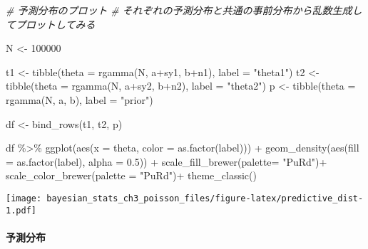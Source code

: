 \documentclass[
]{article}
\newenvironment{Shaded}{\begin{snugshade}}{\end{snugshade}}
\newcommand{\AttributeTok}[1]{\textcolor[rgb]{0.77,0.63,0.00}{#1}}
\newcommand{\CommentTok}[1]{\textcolor[rgb]{0.56,0.35,0.01}{\textit{#1}}}
\newcommand{\DecValTok}[1]{\textcolor[rgb]{0.00,0.00,0.81}{#1}}
\newcommand{\FloatTok}[1]{\textcolor[rgb]{0.00,0.00,0.81}{#1}}
\newcommand{\FunctionTok}[1]{\textcolor[rgb]{0.00,0.00,0.00}{#1}}
\newcommand{\NormalTok}[1]{#1}
\newcommand{\OtherTok}[1]{\textcolor[rgb]{0.56,0.35,0.01}{#1}}
\newcommand{\SpecialCharTok}[1]{\textcolor[rgb]{0.00,0.00,0.00}{#1}}
\newcommand{\StringTok}[1]{\textcolor[rgb]{0.31,0.60,0.02}{#1}}
\begin{document}
\begin{Shaded}
\begin{Highlighting}[]
\CommentTok{\# 予測分布のプロット}
\CommentTok{\# それぞれの予測分布と共通の事前分布から乱数生成してプロットしてみる}

\NormalTok{N }\OtherTok{\textless{}{-}} \DecValTok{100000}

\NormalTok{t1 }\OtherTok{\textless{}{-}} \FunctionTok{tibble}\NormalTok{(}\AttributeTok{theta =} \FunctionTok{rgamma}\NormalTok{(N, a}\SpecialCharTok{+}\NormalTok{sy1, b}\SpecialCharTok{+}\NormalTok{n1),}
             \AttributeTok{label =} \StringTok{"theta1"}\NormalTok{)}
\NormalTok{t2 }\OtherTok{\textless{}{-}} \FunctionTok{tibble}\NormalTok{(}\AttributeTok{theta =} \FunctionTok{rgamma}\NormalTok{(N, a}\SpecialCharTok{+}\NormalTok{sy2, b}\SpecialCharTok{+}\NormalTok{n2),}
             \AttributeTok{label =} \StringTok{"theta2"}\NormalTok{)}
\NormalTok{p }\OtherTok{\textless{}{-}} \FunctionTok{tibble}\NormalTok{(}\AttributeTok{theta =} \FunctionTok{rgamma}\NormalTok{(N, a, b),}
            \AttributeTok{label =} \StringTok{"prior"}\NormalTok{)}

\NormalTok{df }\OtherTok{\textless{}{-}} \FunctionTok{bind\_rows}\NormalTok{(t1, t2, p)}


\NormalTok{df }\SpecialCharTok{\%\textgreater{}\%} 
  \FunctionTok{ggplot}\NormalTok{(}\FunctionTok{aes}\NormalTok{(}\AttributeTok{x =}\NormalTok{ theta, }\AttributeTok{color =} \FunctionTok{as.factor}\NormalTok{(label))) }\SpecialCharTok{+} 
  \FunctionTok{geom\_density}\NormalTok{(}\FunctionTok{aes}\NormalTok{(}\AttributeTok{fill =} \FunctionTok{as.factor}\NormalTok{(label), }\AttributeTok{alpha =} \FloatTok{0.5}\NormalTok{)) }\SpecialCharTok{+}  
  \FunctionTok{scale\_fill\_brewer}\NormalTok{(}\AttributeTok{palette=} \StringTok{"PuRd"}\NormalTok{)}\SpecialCharTok{+}
  \FunctionTok{scale\_color\_brewer}\NormalTok{(}\AttributeTok{palette =} \StringTok{"PuRd"}\NormalTok{)}\SpecialCharTok{+}
  \FunctionTok{theme\_classic}\NormalTok{()}
\end{Highlighting}
\end{Shaded}

\texttt{[image: bayesian\_stats\_ch3\_poisson\_files/figure-latex/predictive\_dist-1.pdf]}

\hypertarget{ux4e88ux6e2cux5206ux5e03}{%
\paragraph{予測分布}\label{ux4e88ux6e2cux5206ux5e03}}
\end{document}
